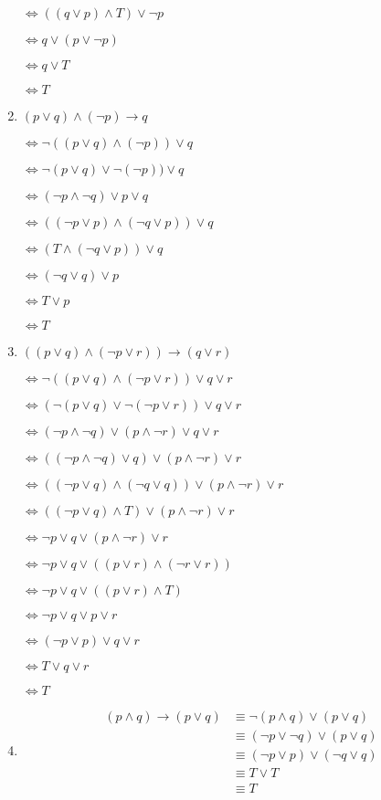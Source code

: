 \documentclass{../../cls/sig-alternate-05-2015}
\begin{document}
\begin{enumerate}
$\Leftrightarrow   (( q \lor p) \land T)\lor \neg p$

$\Leftrightarrow    q \lor (p\lor \neg p)$

$\Leftrightarrow    q \lor T$

$\Leftrightarrow     T$
\item $ (p\lor q)\land (\neg p) \rightarrow q$

$\Leftrightarrow \neg ((p\lor q)\land (\neg p)) \lor q$

$\Leftrightarrow \neg(p\lor q)\lor \neg (\neg p)) \lor q$

$\Leftrightarrow (\neg p\land \neg q )\lor p \lor q$

$\Leftrightarrow ((\neg p \lor p )\land (\neg q \lor p)) \lor q$

$\Leftrightarrow (T\land (\neg q \lor p)) \lor q$

$\Leftrightarrow (\neg q \lor q) \lor p$

$\Leftrightarrow T \lor p$

$\Leftrightarrow T$
\item $ ((p \lor q) \land (\neg p \lor r)) \rightarrow (q\lor r)$

$\Leftrightarrow \neg  ((p \lor q) \land (\neg p \lor r)) \lor q\lor r$

$\Leftrightarrow   (\neg(p \lor q) \lor \neg (\neg p \lor r)) \lor q \lor r$

$\Leftrightarrow   (\neg p \land \neg q) \lor (p \land \neg r) \lor q\lor r$

$\Leftrightarrow   ((\neg p \land \neg q)\lor q) \lor (p \land \neg r) \lor r$

$\Leftrightarrow   ((\neg p\lor q) \land (\neg q\lor q) )\lor ( p \land \neg r) \lor r$

$\Leftrightarrow   ((\neg p\lor q) \land T )\lor ( p \land \neg r) \lor r$

$\Leftrightarrow   \neg p\lor q\lor (p \land \neg r) \lor r$

$\Leftrightarrow   \neg p\lor q\lor ((p \lor r)\land (\neg r\lor r)) $

$\Leftrightarrow   \neg p\lor q\lor (( p \lor r)\land T) $

$\Leftrightarrow   \neg p\lor q\lor p \lor r $

$\Leftrightarrow   (\neg p\lor p)\lor q \lor r $

$\Leftrightarrow   T\lor q \lor r $

$\Leftrightarrow   T $
\item 
\begin{align}
    (p \land q) \rightarrow (p \lor q)  & \equiv \neg (p \land q) \lor (p \lor q)\\
    & \equiv (\neg p \lor \neg q) \lor (p \lor q)\\
    & \equiv (\neg p \lor p) \lor (\neg q \lor q)\\
    & \equiv T \lor T\\
    & \equiv T
\end{align}
\end{enumerate}
\end{document}
